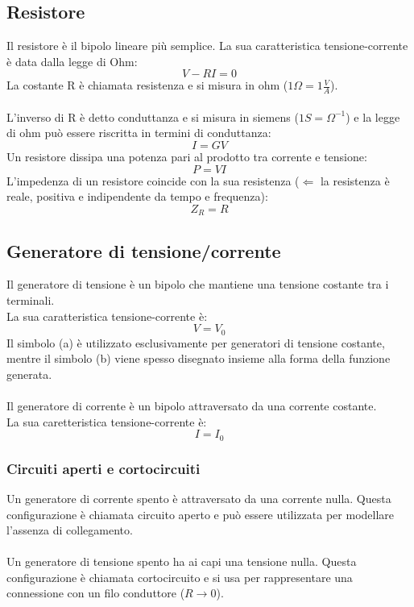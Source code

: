 \documentclass{article}
\begin{document}
\subsection{Resistore}
Il resistore è il bipolo lineare più semplice. La sua caratteristica tensione-corrente è data dalla legge di Ohm:
$$ V-RI=0 $$
La costante R è chiamata resistenza e si misura in ohm ($1\Omega=1\frac{V}{A}$).\\\\
L'inverso di R è detto conduttanza e si misura in siemens ($1S=\Omega^{-1}$) e la legge di ohm può essere riscritta in termini di conduttanza:
$$ I=GV $$
Un resistore dissipa una potenza pari al prodotto tra corrente e tensione:
$$ P=VI $$
L'impedenza di un resistore coincide con la sua resistenza ($\Leftarrow$ la resistenza è reale, positiva e indipendente da tempo e frequenza):
$$ Z_R=R $$

\subsection{Generatore di tensione/corrente}
Il generatore di tensione è un bipolo che mantiene una tensione costante tra i terminali.\\
La sua caratteristica tensione-corrente è:
$$ V=V_0 $$
Il simbolo (a) è utilizzato esclusivamente per generatori di tensione costante, mentre il simbolo (b) viene spesso disegnato insieme alla forma della funzione generata.\\\\
Il generatore di corrente è un bipolo attraversato da una corrente costante.\\
La sua caretteristica tensione-corrente è:
$$ I=I_0 $$

\subsubsection{Circuiti aperti e cortocircuiti}
Un generatore di corrente spento è attraversato da una corrente nulla. Questa configurazione è chiamata circuito aperto e può essere utilizzata per modellare l'assenza di collegamento.\\\\
Un generatore di tensione spento ha ai capi una tensione nulla. Questa configurazione è chiamata cortocircuito e si usa per rappresentare una connessione con un filo conduttore ($R\rightarrow0$).
\end{document}
